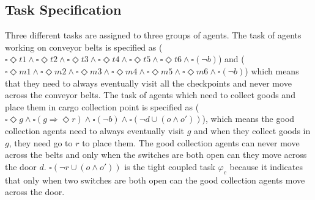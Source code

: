 \documentclass[journal]{IEEEtran}
\begin{document}
\subsection{Task Specification}
Three different tasks are assigned to three groups of agents. The task of agents working on conveyor belts is specified as ($\square\Diamond t1 \wedge \square\Diamond t2 \wedge \square\Diamond t3 \wedge \square\Diamond t4 \wedge \square\Diamond t5 \wedge \square\Diamond t6 \wedge \square(\neg b)$) and ($\square\Diamond m1 \wedge \square\Diamond m2 \wedge \square\Diamond m3 \wedge \square\Diamond m4 \wedge \square\Diamond m5 \wedge \square\Diamond m6 \wedge \square(\neg b)$) which means that they need to always eventually visit all the checkpoints and never move across the conveyor belts. The task of agents which need to collect goods and place them in cargo collection point is specified as ($\square\Diamond g \wedge \square(g\Longrightarrow \Diamond r) \wedge \square(\neg b) \wedge \square(\neg d \cup (o \wedge o'))$), which means the good collection agents need to always eventually visit $g$ and when they collect goods in $g$, they need go to $r$ to place them. The good collection agents can never move across the belts and only when the switches are both open can they move across the door $d$. $\square(\neg r \cup (o \wedge o'))$ is the tight coupled task $\varphi_c$ because it indicates that only when two switches are both open can the good collection agents move across the door.
\end{document}
